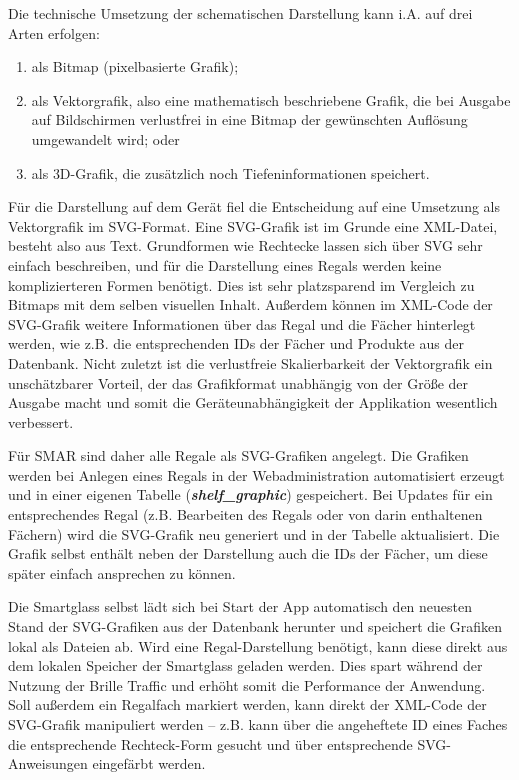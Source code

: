 Die technische Umsetzung der schematischen Darstellung kann i.A. auf drei Arten erfolgen:

\begin{enumerate}
	\item als Bitmap (pixelbasierte Grafik);
	\item als Vektorgrafik, also eine mathematisch beschriebene Grafik, die bei Ausgabe auf Bildschirmen verlustfrei in eine Bitmap der gewünschten Auflösung umgewandelt wird; oder
	\item als \acs{3D}-Grafik, die zusätzlich noch Tiefeninformationen speichert.
\end{enumerate}

Für die Darstellung auf dem Gerät fiel die Entscheidung auf eine Umsetzung als Vektorgrafik im \acs{SVG}-Format. Eine \acs{SVG}-Grafik ist im Grunde eine \acs{XML}-Datei, besteht also aus Text. Grundformen wie Rechtecke lassen sich über \acs{SVG} sehr einfach beschreiben, und für die Darstellung eines Regals werden keine komplizierteren Formen benötigt. Dies ist sehr platzsparend im Vergleich zu Bitmaps mit dem selben visuellen Inhalt. Außerdem können im \acs{XML}-Code der \acs{SVG}-Grafik weitere Informationen über das Regal und die Fächer hinterlegt werden, wie z.B. die entsprechenden IDs der Fächer und Produkte aus der Datenbank. Nicht zuletzt ist die verlustfreie Skalierbarkeit der Vektorgrafik ein unschätzbarer Vorteil, der das Grafikformat unabhängig von der Größe der Ausgabe macht und somit die Geräteunabhängigkeit der Applikation wesentlich verbessert.

Für SMAR sind daher alle Regale als \acs{SVG}-Grafiken angelegt. Die Grafiken werden bei Anlegen eines Regals in der Webadministration automatisiert erzeugt und in einer eigenen Tabelle (\textbf{\textit{shelf\_graphic}}) gespeichert. Bei Updates für ein entsprechendes Regal (z.B. Bearbeiten des Regals oder von darin enthaltenen Fächern) wird die \acs{SVG}-Grafik neu generiert und in der Tabelle aktualisiert. Die Grafik selbst enthält neben der Darstellung auch die IDs der Fächer, um diese später einfach ansprechen zu können.

Die Smartglass selbst lädt sich bei Start der App automatisch den neuesten Stand der \acs{SVG}-Grafiken aus der Datenbank herunter und speichert die Grafiken lokal als Dateien ab. Wird eine Regal-Darstellung benötigt, kann diese direkt aus dem lokalen Speicher der Smartglass geladen werden. Dies spart während der Nutzung der Brille Traffic und erhöht somit die Performance der Anwendung. Soll außerdem ein Regalfach markiert werden, kann direkt der \acs{XML}-Code der \acs{SVG}-Grafik manipuliert werden -- z.B. kann über die angeheftete ID eines Faches die entsprechende Rechteck-Form gesucht und über entsprechende \acs{SVG}-Anweisungen eingefärbt werden.



